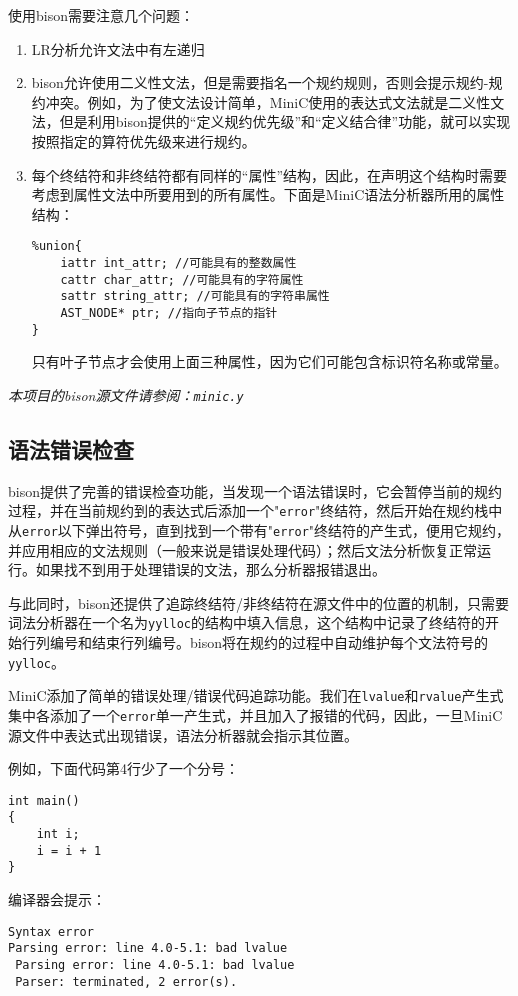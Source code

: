 使用bison需要注意几个问题：
\begin{enumerate}
\item LR分析允许文法中有左递归
\item bison允许使用二义性文法，但是需要指名一个规约规则，否则会提示规约-规约冲突。例如，为了使文法设计简单，MiniC使用的表达式文法就是二义性文法，但是利用bison提供的“定义规约优先级”和“定义结合律”功能，就可以实现按照指定的算符优先级来进行规约。
\item 每个终结符和非终结符都有同样的“属性”结构，因此，在声明这个结构时需要考虑到属性文法中所要用到的所有属性。下面是MiniC语法分析器所用的属性结构：
	\begin{lstlisting}
%union{
	iattr int_attr; //可能具有的整数属性
	cattr char_attr; //可能具有的字符属性
	sattr string_attr; //可能具有的字符串属性
	AST_NODE* ptr; //指向子节点的指针
}
	\end{lstlisting}
只有叶子节点才会使用上面三种属性，因为它们可能包含标识符名称或常量。

\end{enumerate}
{\it \anchor 本项目的bison源文件请参阅：\verb|minic.y|}\\
\subsection{语法错误检查}

\label{syntexerror}
bison提供了完善的错误检查功能，当发现一个语法错误时，它会暂停当前的规约过程，并在当前规约到的表达式后添加一个"\verb|error|"终结符，然后开始在规约栈中从\verb|error|以下弹出符号，直到找到一个带有"\verb|error|"终结符的产生式，便用它规约，并应用相应的文法规则（一般来说是错误处理代码）；然后文法分析恢复正常运行。如果找不到用于处理错误的文法，那么分析器报错退出。

与此同时，bison还提供了追踪终结符/非终结符在源文件中的位置的机制，只需要词法分析器在一个名为\verb|yylloc|的结构中填入信息，这个结构中记录了终结符的开始行列编号和结束行列编号。bison将在规约的过程中自动维护每个文法符号的\verb|yylloc|。

MiniC添加了简单的错误处理/错误代码追踪功能。我们在\verb|lvalue|和\verb|rvalue|产生式集中各添加了一个\verb|error|单一产生式，并且加入了报错的代码，因此，一旦MiniC源文件中表达式出现错误，语法分析器就会指示其位置。

例如，下面代码第4行少了一个分号：
\begin{lstlisting}
int main()
{
	int i;
	i = i + 1
}
\end{lstlisting}
编译器会提示：
\begin{verbatim}
Syntax error
Parsing error: line 4.0-5.1: bad lvalue
 Parsing error: line 4.0-5.1: bad lvalue
 Parser: terminated, 2 error(s).
\end{verbatim}
